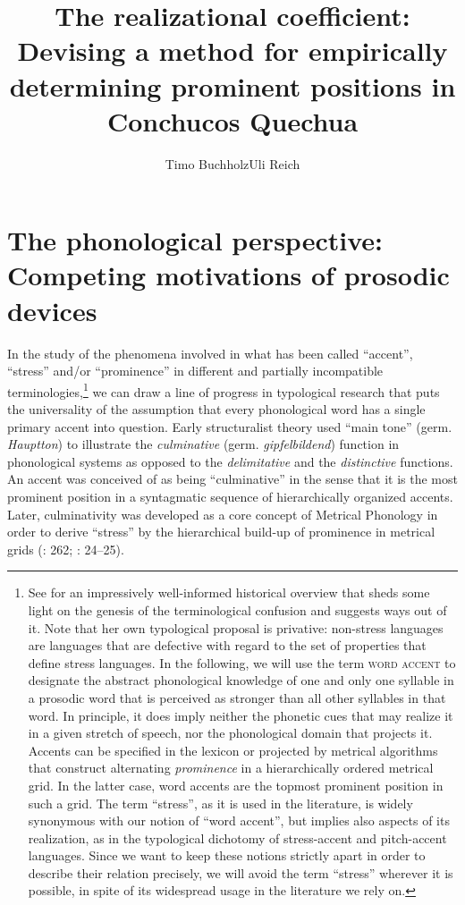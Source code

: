 \documentclass[output=paper]{LSP/langsci}
\author{Timo Buchholz\affiliation{Freie Universität Berlin}\lastand Uli Reich\affiliation{Freie Universität Berlin}}
\title{The realizational coefficient: Devising a method for empirically determining prominent positions in Conchucos Quechua}
\begin{document}
\label{chap:buc}\label{ch:4}

\section{The phonological perspective: Competing motivations of prosodic devices}
In the study of the phenomena involved in what has been called ``accent'', ``stress'' and\slash or ``prominence'' in different and partially incompatible terminologies,\footnote{See \citet{Beckman1986} for an impressively well-informed historical overview that sheds some light on the genesis of the terminological confusion and suggests ways out of it. Note that her own typological proposal is privative: non-stress languages are languages that are defective with regard to the set of properties that define stress languages. In the following, we will use the term \textsc{word accent} to designate the abstract phonological knowledge of one and only one syllable in a prosodic word that is perceived as stronger than all other syllables in that word. In principle, it does imply neither the phonetic cues that may realize it in a given stretch of speech, nor the phonological domain that projects it. Accents can be specified in the lexicon or projected by metrical algorithms that construct alternating \textit{prominence} in a hierarchically ordered metrical grid. In the latter case, word accents are the topmost prominent position in such a grid. The term ``stress'', as it is used in the literature, is widely synonymous with our notion of ``word accent'', but implies also aspects of its realization, as in the typological dichotomy of {stress-accent} and {pitch-accent} languages. Since we want to keep these notions strictly apart in order to describe their relation precisely, we will avoid the term ``stress'' wherever it is possible, in spite of its widespread usage in the literature we rely on.} we can draw a line of progress in typological research that puts the universality of the assumption that every phonological word has a single primary accent into question. Early structuralist theory \citep{Trubeckoj1939} used ``main tone'' (germ. \textit{Hauptton}) to illustrate the \textit{culminative} (germ. \textit{gipfelbildend}) function in phonological systems as opposed to the \textit{delimitative} and the \textit{distinctive} functions. An accent was conceived of as being ``culminative'' in the sense that it is the most prominent position in a syntagmatic sequence of hierarchically organized accents. Later, culminativity was developed as a core concept of Metrical Phonology in order to derive ``stress'' by the hierarchical build-up of prominence in metrical grids (\citealt{Liberman1977}: 262; \citealt{Hayes1995}: 24–25). 
\end{document}
